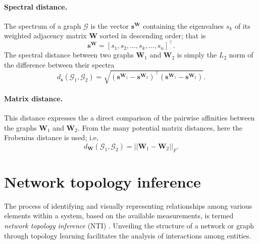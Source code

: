\paragraph*{Spectral distance.} The spectrum of a graph $\mathcal{G}$ is the vector $ \bm{s}^{\bm{W}}$ containing the eigenvalues $s_k$ of its weighted adjacency matrix $\bm{W}$ sorted in descending order; that is
\begin{equation}
	\bm{s}^{\bm{W}} = [s_1,s_2,\ldots,s_k,\ldots,s_n]^\intercal.
\end{equation}
The spectral distance between two graphs $\bm{W}_1$ and $\bm{W}_2$ is simply the $L_2$ norm of the difference between their spectra
\begin{equation}
	d_{\bm{s}}\left(\mathcal{G}_1,\mathcal{G}_2\right) = \sqrt{\left(\bm{s}^{\bm{W}_1}-\bm{s}^{\bm{W}_2}\right)^\intercal\left(\bm{s}^{\bm{W}_1}-\bm{s}^{\bm{W}_2}\right)}.
\end{equation}

\paragraph*{Matrix distance.} This distance expresses the a direct comparison of the pairwise affinities between the graphs $\bm{W}_1$ and $\bm{W}_2$. From the many potential matrix distances, here the Frobenius distance is used; i.e,
\begin{equation}
	d_{\bm{W}}\left(\mathcal{G}_1,\mathcal{G}_2\right) =\lvert \lvert \bm{W}_1- \bm{W}_2\rvert \rvert_F.
\end{equation}

\section{Network topology inference}
The process of identifying and visually representing relationships among various elements within a system, based on the available measurements, is termed \emph{network topology inference} (NTI) \cite{Dong2019Learninggraphsdata}. Unveiling the structure of a network or graph through topology learning facilitates the analysis of interactions among entities. 

